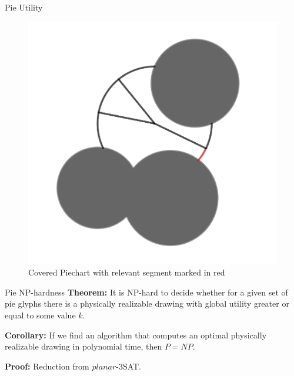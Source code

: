 \documentclass{beamer}
\begin{document}
\begin{frame}{Pie Utility}
  
  \begin{figure}[h]
    \centering
      \includegraphics[width=0.5\linewidth]{assets/piecharts_utility.png}
      \caption{Covered Piechart with relevant segment marked in red}
  \end{figure}
\end{frame}


\begin{frame}{Pie NP-hardness}
  \textbf{Theorem:} It is NP-hard to decide whether for a given set of pie glyphs there is a physically realizable drawing with global utility greater or equal to some value $k$.
  
  \textbf{Corollary:} If we find an algorithm that computes an optimal physically realizable drawing in polynomial time, then $P=NP$.
  
  \textbf{Proof:} Reduction from $planar$-3SAT.
\end{frame}
\end{document}
